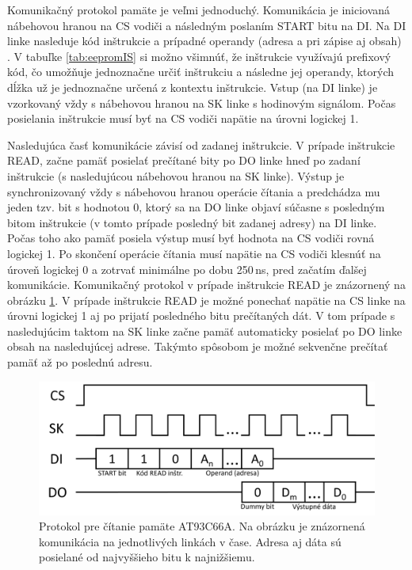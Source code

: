 Komunikačný protokol pamäte je veľmi jednoduchý. Komunikácia je iniciovaná nábehovou hranou na CS vodiči a následným poslaním START bitu na DI. Na DI linke nasleduje kód inštrukcie a prípadné operandy (adresa a pri zápise aj obsah) \cite{eepromDatasheet}. V tabuľke \ref{tab:eepromIS} si možno všimnúť, že inštrukcie využívajú prefixový kód, čo umožňuje jednoznačne určiť inštrukciu a následne jej operandy, ktorých dĺžka už je jednoznačne určená z kontextu inštrukcie. Vstup (na DI linke) je vzorkovaný vždy s nábehovou hranou na SK linke s hodinovým signálom. Počas posielania inštrukcie musí byť na CS vodiči napätie na úrovni logickej 1.

Nasledujúca časť komunikácie závisí od zadanej inštrukcie. V prípade inštrukcie READ, začne pamäť posielať prečítané bity po DO linke hneď po zadaní inštrukcie (s nasledujúcou nábehovou hranou na SK linke). Výstup je synchronizovaný vždy s nábehovou hranou operácie čítania a predchádza mu jeden tzv.  bit s hodnotou 0, ktorý sa na DO linke objaví súčasne s posledným bitom inštrukcie (v tomto prípade posledný bit zadanej adresy) na DI linke. Počas toho ako pamäť posiela výstup musí byť hodnota na CS vodiči rovná logickej 1. Po skončení operácie čítania musí napätie na CS vodiči klesnúť na úroveň logickej 0 a zotrvať minimálne po dobu 250\,ns, pred začatím ďalšej komunikácie. Komunikačný protokol v prípade inštrukcie READ je znázornený na obrázku \ref{obr:eepromREAD}. V prípade inštrukcie READ je možné ponechať napätie na CS linke na úrovni logickej 1 aj po prijatí posledného bitu prečítaných dát. V tom prípade s nasledujúcim taktom na SK linke začne pamäť automaticky posielať po DO linke obsah na nasledujúcej adrese. Takýmto spôsobom je možné sekvenčne prečítať pamäť až po poslednú adresu.

\begin{figure}
    \centerline{\includegraphics[width=1\textwidth]{images/eepromREAD.png}}
    \caption[Protokol pre čítanie pamäte AT93C66A]{Protokol pre čítanie pamäte AT93C66A. Na obrázku je znázornená komunikácia na jednotlivých linkách v čase. Adresa aj dáta sú posielané od najvyššieho bitu k najnižšiemu.}
    \label{obr:eepromREAD}
\end{figure}

